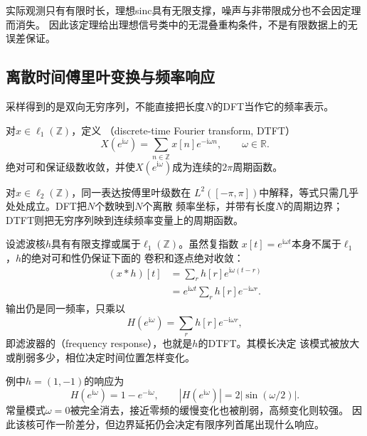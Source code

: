 实际观测只有有限时长，理想sinc具有无限支撑，噪声与非带限成分也不会因定理而消失。
因此该定理给出理想信号类中的无混叠重构条件，不是有限数据上的无误差保证。

\subsection{离散时间傅里叶变换与频率响应}

采样得到的是双向无穷序列，不能直接把长度$N$的DFT当作它的频率表示。
\begin{definition}[离散时间傅里叶变换]
\label{def:signal-analysis-dtft}
对$x\in\ell_1(\mathbb{Z})$，定义
（discrete-time Fourier transform, DTFT）
\begin{equation}
  X(e^{\mathrm{i}\omega})
  =
  \sum_{n\in\mathbb{Z}}x[n]e^{-\mathrm{i}\omega n},
  \qquad \omega\in\mathbb{R}.
  \label{eq:signal-analysis-dtft}
\end{equation}
绝对可和保证级数收敛，并使$X(e^{\mathrm{i}\omega})$成为连续的$2\pi$周期函数。
\end{definition}
对$x\in\ell_2(\mathbb{Z})$，同一表达按傅里叶级数在
$L^2([-\pi,\pi])$中解释，等式只需几乎处处成立。DFT把$N$个数映到$N$个离散
频率坐标，并带有长度$N$的周期边界；DTFT则把无穷序列映到连续频率变量上的周期函数。

设滤波核$h$具有有限支撑或属于$\ell_1(\mathbb{Z})$。虽然复指数
$x[t]=e^{\mathrm{i}\omega t}$本身不属于$\ell_1$，$h$的绝对可和性仍保证下面的
卷积和逐点绝对收敛：
\begin{align*}
  (x*h)[t]
  &=
  \sum_r h[r]e^{\mathrm{i}\omega(t-r)}\\
  &=
  e^{\mathrm{i}\omega t}
  \sum_r h[r]e^{-\mathrm{i}\omega r}.
\end{align*}
输出仍是同一频率，只乘以
\begin{equation}
  H(e^{\mathrm{i}\omega})
  =
  \sum_r h[r]e^{-\mathrm{i}\omega r},
  \label{eq:signal-analysis-filter-frequency-response}
\end{equation}
即滤波器的（frequency response），也就是$h$的DTFT。其模长决定
该模式被放大或削弱多少，相位决定时间位置怎样变化。

例中$h=(1,-1)$的响应为
\[
  H(e^{\mathrm{i}\omega})=1-e^{-\mathrm{i}\omega},
  \qquad
  |H(e^{\mathrm{i}\omega})|=2|\sin(\omega/2)|.
\]
常量模式$\omega=0$被完全消去，接近零频的缓慢变化也被削弱，高频变化则较强。
因此该核可作一阶差分，但边界延拓仍会决定有限序列首尾出现什么响应。


